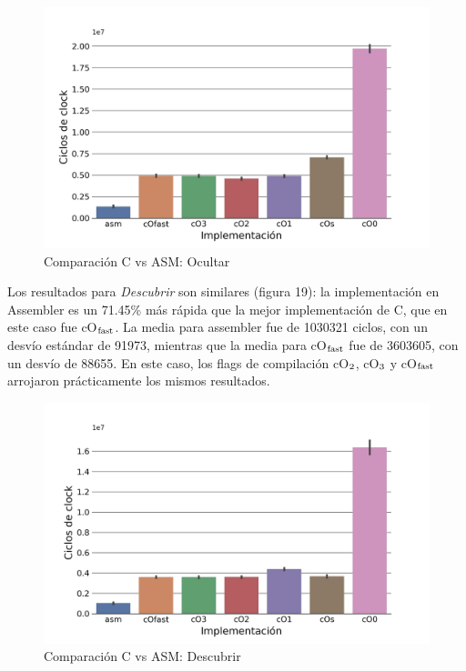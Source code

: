 \documentclass[a4paper]{article}
\begin{document}
\begin{figure}[!htb]
  \begin{center}
	\includegraphics[scale=0.1]{img/exp0ocultar.jpg}
	\caption{Comparación C vs ASM: Ocultar}
  \end{center}
\end{figure}


Los resultados para \textit{Descubrir} son similares (figura 19): la implementación en Assembler es un 71.45\% más rápida que la mejor implementación de C, que en este caso fue cO$\textsubscript{fast}$. La media para assembler fue de 1030321 ciclos, con un desvío estándar de 91973, mientras que la media para cO$\textsubscript{fast}$ fue de 3603605, con un desvío de 88655. En este caso, los flags de compilación cO$\textsubscript{2}$, cO$\textsubscript{3}$ y cO$\textsubscript{fast}$ arrojaron prácticamente los mismos resultados.

\begin{figure}[!htb]
  \begin{center}
	\includegraphics[scale=0.1]{img/exp0descubrir.jpg}
	\caption{Comparación C vs ASM: Descubrir}
  \end{center}
\end{figure}
\end{document}
